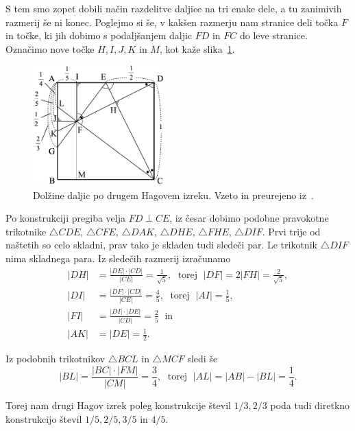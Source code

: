 S tem smo zopet dobili način razdelitve daljice na tri enake dele, a tu zanimivih razmerij še ni konec. Poglejmo si še, v kakšen razmerju nam stranice deli točka $F$ in točke, ki jih dobimo s podaljšanjem daljic $FD$ in $FC$ do leve stranice. Označimo nove točke $H, I, J, K$ in $M$, kot kaže slika~\ref{fig:hagov_izrek2_st}.

\begin{figure}[h]
    \centering
    \includegraphics[width=0.45\textwidth]{images/hagovi_izreki/hagov_izrek2_stevilke.png}
    \caption[Drugi Hagov izrek v številkah]{Dolžine daljic po drugem Hagovem izreku. Vzeto in preurejeno iz~\cite[str. 15]{haga2008}.}
    \label{fig:hagov_izrek2_st}
\end{figure}

Po konstrukciji pregiba velja $FD \perp CE$, iz česar dobimo podobne pravokotne trikotnike $\triangle CDE$, $\triangle CFE$, $\triangle DAK$, $\triangle DHE$, $\triangle FHE$, $\triangle DIF$. Prvi trije od naštetih so celo skladni, prav tako je skladen tudi sledeči par. Le trikotnik $\triangle DIF$ nima skladnega para. Iz sledečih razmerij izračunamo
\begin{align*}
    |DH| &= \frac{|DE| \cdot |CD|}{|CE|} = \frac{1}{\sqrt{5}}, \; \text{ torej } \; |DF| = 2|FH| = \frac{2}{\sqrt{5}}, \\
    |DI| &= \frac{|DF| \cdot |CD|}{|CE|} = \frac{4}{5}, \; \text{ torej } \; |AI| = \frac{1}{5}, \\
    |FI| &= \frac{|DI| \cdot |DE|}{|CD|} = \frac{2}{5} \; \text{ in} \\
    |AK| &= |DE| = \frac{1}{2}.
\end{align*}

Iz podobnih trikotnikov $\triangle BCL$ in $\triangle MCF$ sledi še
$$ |BL| = \frac{|BC| \cdot |FM|}{|CM|} = \frac{3}{4}, \; \text{ torej } \; |AL| = |AB| - |BL| = \frac{1}{4}. $$

Torej nam drugi Hagov izrek poleg konstrukcije števil $1/3, 2/3$ poda tudi diretkno konstrukcijo števil $1/5, 2/5, 3/5$ in $4/5$.

